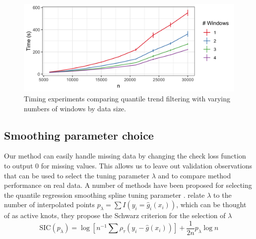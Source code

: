 \documentclass[12pt]{article}
\begin{document}
	\begin{figure}[!h] 
		\centering
		\caption{Timing experiments comparing quantile trend filtering with varying numbers of windows by data size.}
		\includegraphics[width = 0.7\linewidth]{Figures/Fig_timing_experiment.png}
	\end{figure}

	\subsection{Smoothing parameter choice}
	Our method can easily handle missing data by changing the check loss function to output 0 for missing values. This allows us to leave out validation observations that can be used to select the tuning parameter $\lambda$ and to compare method performance on real data. A number of methods have been proposed for selecting the quantile regression smoothing spline tuning parameter \cite{yuan2006gacv}.  \cite{KoenkerNgPortnoy1994} relate $\lambda$ to the number of interpolated points $p_{\lambda} = \sum I(y_i = \widehat{g}_i(x_i))$, which can be thought of as active knots, they propose the Schwarz criterion for the selection of $\lambda$
	\begin{equation}
	\mbox{SIC}(p_{\lambda}) = \log[n^{-1}\sum\rho_{\tau}(y_i - \widehat{g}(x_i))] + \frac{1}{2n}p_{\lambda}\log n
	\end{equation}
	
\end{document}
